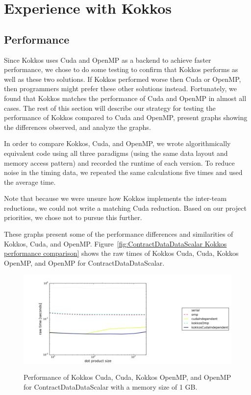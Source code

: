 \chapter{Experience with Kokkos}
\section{Performance}
Since Kokkos uses Cuda and OpenMP as a backend to achieve faster performance, we
chose to do some testing to confirm that Kokkos performs as well as these two
solutions. If Kokkos performed worse then Cuda or OpenMP, then programmers might
prefer these other solutions instead.  Fortunately, we found that Kokkos matches
the performance of Cuda and OpenMP in almost all cases.  The rest of this
section will describe our strategy for testing the performance of Kokkos
compared to Cuda and OpenMP, present graphs showing the differences observed,
and analyze the graphs.

In order to compare Kokkos, Cuda, and OpenMP, we wrote algorithmically
equivalent code using all three paradigms (using the same data layout and memory
access pattern) and recorded the runtime of each version.  To reduce noise in
the timing data, we repeated the same calculations five times and used the
average time.

Note that because we were unsure how Kokkos implements the inter-team reductions, 
we could not write a matching Cuda reduction.  Based on our project
priorities, we chose not to pursue this further.

These graphs present some of the performance differences and similarities of
Kokkos, Cuda, and OpenMP. Figure~\ref{fig:ContractDataDataScalar Kokkos
performance comparison} shows the raw times of Kokkos Cuda, Cuda, Kokkos OpenMP,
and OpenMP for ContractDataDataScalar.

\begin{figure}[!ht]
{\includegraphics[scale=.4]{CDDS_RawTimes_2d_largestSize_ComparisonFixed.pdf}}
\caption[ContractDataDataScalar Kokkos performance comparison]{
    Performance of Kokkos Cuda, Cuda, Kokkos OpenMP,
and OpenMP for ContractDataDataScalar with a memory size of 1 GB.}
\label{fig:ContractDataDataScalar Kokkos performance comparison}
\end{figure}

